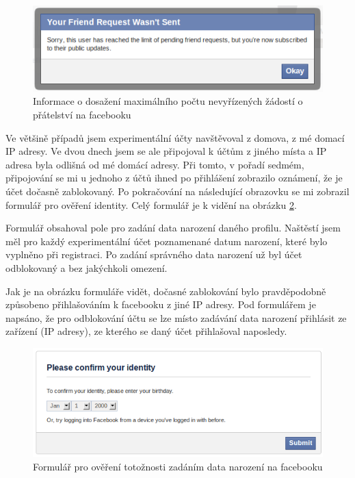 \documentclass[thesis=M,czech]{FITthesis}[2013/05/10]
\begin{document}
\begin{figure}[h]
\begin{center}
\includegraphics[width=5in]{figures/friendRequestsLimitReached.png}
\caption{Informace o dosažení maximálního počtu nevyřízených žádostí o přátelství na facebooku}
\label{fig:friendRequestsLimitReached}
\end{center}
\end{figure}

Ve většině případů jsem experimentální účty navštěvoval z domova, z mé domací IP adresy. Ve dvou dnech jsem se ale připojoval k účtům z jiného místa a IP adresa byla odlišná od mé domácí adresy. Při tomto, v pořadí sedmém, připojování se mi u jednoho z účtů ihned po přihlášení zobrazilo oznámení, že je účet dočasně zablokovaný. Po pokračování na následující obrazovku se mi zobrazil formulář pro ověření identity. Celý formulář je k vidění na obrázku \ref{fig:confirmIdentity}.

Formulář obsahoval pole pro zadání data narození daného profilu. Naštěstí jsem měl pro každý experimentální účet poznamenané datum narození, které bylo vyplněno při registraci. Po zadání správného data narození už byl účet odblokovaný a bez jakýchkoli omezení. 

Jak je na obrázku formuláře vidět, dočasné zablokování bylo pravděpodobně způsobeno přihlašováním k facebooku z jiné IP adresy. Pod formulářem je napsáno, že pro odblokování účtu se lze místo zadávání data narození přihlásit ze zařízení (IP adresy), ze kterého se daný účet přihlašoval naposledy.

\begin{figure}[h]
\begin{center}
\includegraphics[width=5in]{figures/confirmIdentity.png}
\caption{Formulář pro ověření totožnosti zadáním data narození na facebooku}
\label{fig:confirmIdentity}
\end{center}
\end{figure}
\end{document}

